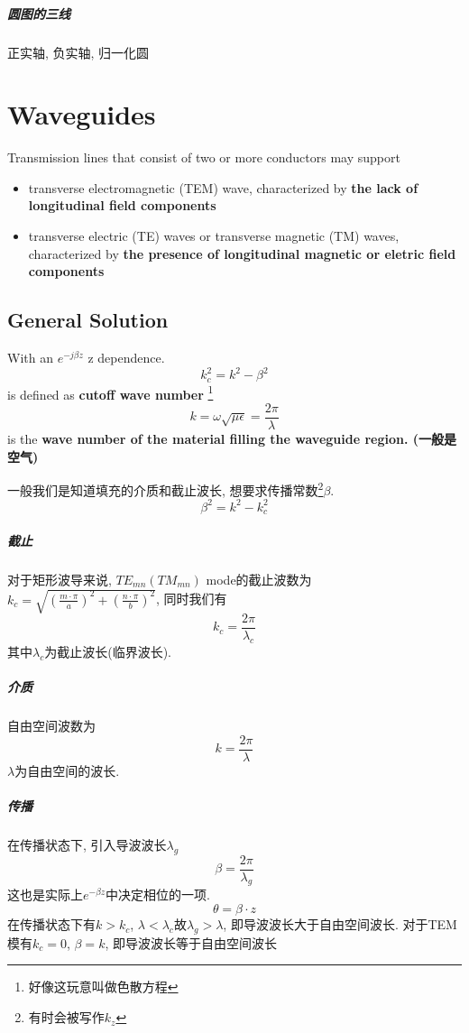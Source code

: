 \documentclass[a4paper]{report}
\begin{document}
\paragraph{圆图的三线}正实轴, 负实轴, 归一化圆

\chapter{Waveguides}
Transmission lines that consist of two or more conductors may support
\begin{itemize}
  \item transverse electromagnetic (TEM) wave, characterized by \textbf{the lack of longitudinal field components}
  \item transverse electric (TE) waves or transverse magnetic (TM) waves, characterized by \textbf{the presence of longitudinal magnetic or eletric field components}
\end{itemize}
\section{General Solution}
With an $e^{-j\beta z}$ z dependence. 
$$k^2_c=k^2-\beta^2$$
is defined as \textbf{cutoff wave number }\footnote{好像这玩意叫做色散方程}
$$k=\omega\sqrt{\mu\epsilon}=\frac{2\pi}{\lambda}$$
is the \textbf{wave number of the material filling the waveguide region. (一般是空气) }

一般我们是知道填充的介质和截止波长, 想要求传播常数\footnote{有时会被写作$k_z$}$\beta$. 
$$\beta^2=k^2-k^2_c$$

\paragraph{截止}对于矩形波导来说, $TE_{mn}(TM_{mn})$ mode的截止波数为
$k_c=\sqrt{(\frac{m\cdot\pi}{a})^2+(\frac{n\cdot \pi}{b})^2}$, 同时我们有
$$k_c=\frac{2\pi}{\lambda_c}$$
其中$\lambda_c$为截止波长(临界波长). 
\paragraph{介质}自由空间波数为$$k=\frac{2\pi}{\lambda}$$
$\lambda$为自由空间的波长. 

\paragraph{传播}在传播状态下, 引入导波波长$\lambda_g$
$$\beta=\frac{2\pi}{\lambda_g}$$
这也是实际上$e^{-\beta z}$中决定相位的一项. 
$$\theta=\beta\cdot z$$
在传播状态下有$k>k_c$, $\lambda<\lambda_c$故$\lambda_g>\lambda$, 即导波波长大于自由空间波长. 对于TEM模有$k_c=0$, $\beta=k$, 即导波波长等于自由空间波长
\end{document}
